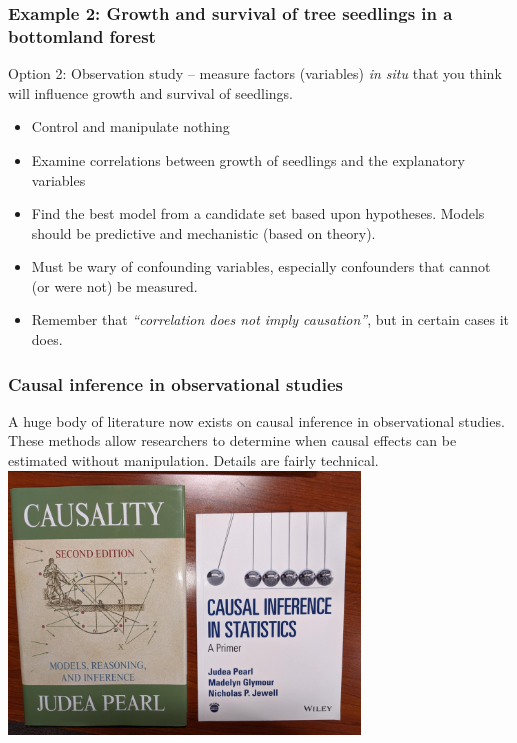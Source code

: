 \documentclass[color=usenames,dvipsnames]{beamer}\usepackage[]{graphicx}\usepackage[]{xcolor}
\begin{document}
\begin{frame}
  \frametitle{Example 2: Growth and survival of
    tree seedlings in a bottomland forest}
  Option 2: Observation study -- measure factors (variables) {\it in
    situ} that you think will influence growth and survival of seedlings. 
  \vspace{6pt}
  \begin{itemize}
    \item Control and manipulate nothing
    \item Examine correlations between growth of seedlings and
      the explanatory variables
    \item Find the best model from a candidate set based upon
      hypotheses. Models should be predictive and
      mechanistic (based on theory).
    \item Must be wary of confounding variables, especially
      confounders that cannot (or were not) be measured.
    \item Remember that {\it ``correlation does not imply
        causation''}, but in certain cases it does. 
  \end{itemize}
\end{frame}



\begin{frame}
  \frametitle{Causal inference in observational studies}
  \small
  A huge body of literature now exists on causal inference in
  observational studies. These methods allow researchers to determine
  when causal effects can be estimated without manipulation. Details
  are fairly technical. \\ 
  \vfill
  \centering
  \includegraphics[width=0.7\textwidth]{pearl} \\
\end{frame}
\end{document}
